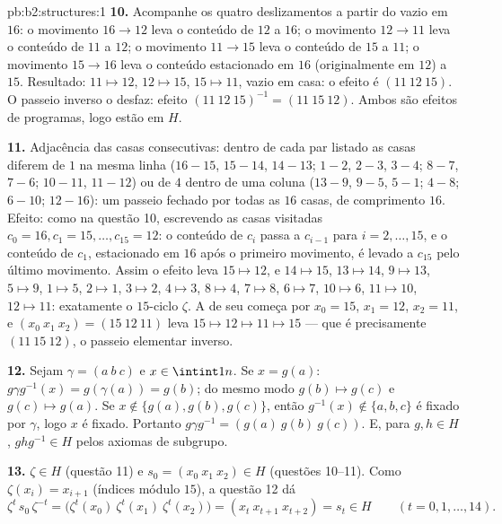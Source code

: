 \begin{solution}{pb:b2:structures:1}
\textbf{10.} Acompanhe os quatro deslizamentos a partir do vazio em $16$: o movimento
$16 \to 12$ leva o conteúdo de $12$ a $16$; o movimento $12 \to 11$
leva o conteúdo de $11$ a $12$; o movimento $11 \to 15$ leva o
conteúdo de $15$ a $11$; o movimento $15 \to 16$ leva o conteúdo
estacionado em $16$ (originalmente em $12$) a $15$. Resultado: $11 \mapsto
12$, $12 \mapsto 15$, $15 \mapsto 11$, vazio em casa: o efeito é
$(11\ 12\ 15)$. O passeio inverso o desfaz: efeito $(11\ 12\
15)^{-1} = (11\ 15\ 12)$. Ambos são efeitos de programas, logo estão em
$H$.

\textbf{11.} Adjacência das casas consecutivas: dentro de cada par
listado as casas diferem de $1$ na mesma linha ($16{-}15$,
$15{-}14$, $14{-}13$; $1{-}2$, $2{-}3$, $3{-}4$; $8{-}7$,
$7{-}6$; $10{-}11$, $11{-}12$) ou de $4$ dentro de uma coluna
($13{-}9$, $9{-}5$, $5{-}1$; $4{-}8$; $6{-}10$; $12{-}16$): um
passeio fechado por todas as $16$ casas, de comprimento $16$. Efeito: como
na questão 10, escrevendo as casas visitadas $c_0 = 16, c_1 = 15,
\dots, c_{15} = 12$: o conteúdo de $c_i$ passa a $c_{i-1}$ para
$i = 2, \dots, 15$, e o conteúdo de $c_1$, estacionado em $16$
após o primeiro movimento, é levado a $c_{15}$ pelo último movimento.
Assim o efeito leva $15 \mapsto 12$, e $14 \mapsto 15$, $13
\mapsto 14$, $9 \mapsto 13$, $5 \mapsto 9$, $1 \mapsto 5$, $2
\mapsto 1$, $3 \mapsto 2$, $4 \mapsto 3$, $8 \mapsto 4$, $7
\mapsto 8$, $6 \mapsto 7$, $10 \mapsto 6$, $11 \mapsto 10$, $12
\mapsto 11$: exatamente o $15$-ciclo $\zeta$. A  de seu 
começa por $x_0 = 15$, $x_1 = 12$, $x_2 = 11$, e $(x_0\ x_1\ x_2)
= (15\ 12\ 11)$ leva $15 \mapsto 12 \mapsto 11 \mapsto 15$ ---
que é precisamente $(11\ 15\ 12)$, o passeio elementar inverso.

\textbf{12.} Sejam $\gamma = (a\ b\ c)$ e $x \in \intint1n$. Se
$x = g(a)$: $g\gamma g^{-1}(x) = g(\gamma(a)) = g(b)$; do mesmo modo
$g(b) \mapsto g(c)$ e $g(c) \mapsto g(a)$. Se $x \notin
\{g(a), g(b), g(c)\}$, então $g^{-1}(x) \notin \{a,b,c\}$ é
fixado por $\gamma$, logo $x$ é fixado. Portanto $g\gamma g^{-1} =
(g(a)\ g(b)\ g(c))$. E, para $g, h \in H$, $ghg^{-1} \in H$ pelos
axiomas de subgrupo.

\textbf{13.} $\zeta \in H$ (questão 11) e $s_0 = (x_0\ x_1\
x_2) \in H$ (questões 10--11). Como $\zeta(x_i) = x_{i+1}$
(índices módulo $15$), a questão 12 dá
\[
\zeta^{t}\,s_0\,\zeta^{-t}
= \bigl(\zeta^t(x_0)\ \zeta^t(x_1)\ \zeta^t(x_2)\bigr)
= (x_t\ x_{t+1}\ x_{t+2}) = s_t \in H
\qquad (t = 0, 1, \dots, 14).
\]


\end{solution}
